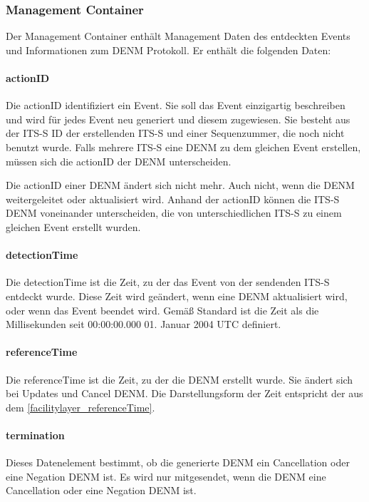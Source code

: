 \subsubsection{Management Container \label{facilityLayer_denmManagementContainer}}
Der Management Container enthält Management Daten des entdeckten Events und Informationen zum \ac{DENM} Protokoll. Er enthält die folgenden Daten:
\paragraph{actionID}
Die actionID identifiziert ein Event. Sie soll das Event einzigartig beschreiben und wird für jedes Event neu generiert und diesem zugewiesen. Sie besteht aus der \ac{ITS-S} \ac{ID} der erstellenden \ac{ITS-S} und einer Sequenzummer, die noch nicht benutzt wurde. Falls mehrere \ac{ITS-S} eine \ac{DENM} zu dem gleichen Event erstellen, müssen sich die actionID der \ac{DENM} unterscheiden. 

Die actionID einer \ac{DENM} ändert sich nicht mehr. Auch nicht, wenn die \ac{DENM} weitergeleitet oder aktualisiert wird. Anhand der actionID können die \ac{ITS-S} \ac{DENM} voneinander unterscheiden, die von unterschiedlichen \ac{ITS-S} zu einem gleichen Event erstellt wurden.

\paragraph{detectionTime \label{facilitylayer_referenceTime}}
Die detectionTime ist die Zeit, zu der das Event von der sendenden \ac{ITS-S} entdeckt wurde. Diese Zeit wird geändert, wenn eine \ac{DENM} aktualisiert wird, oder wenn das Event beendet wird. Gemäß Standard \cite{ts102894-2} ist die Zeit als die Millisekunden seit 00:00:00.000 01. Januar 2004 \ac{UTC} definiert.

\paragraph{referenceTime}
Die referenceTime ist die Zeit, zu der die \ac{DENM} erstellt wurde. Sie ändert sich bei Updates und Cancel \ac{DENM}. Die Darstellungsform der Zeit entspricht der aus dem \autoref{facilitylayer_referenceTime}.

\paragraph{termination}
Dieses Datenelement bestimmt, ob die generierte \ac{DENM} ein Cancellation oder eine Negation \ac{DENM} ist. Es wird nur mitgesendet, wenn die \ac{DENM} eine Cancellation oder eine Negation \ac{DENM} ist. 

